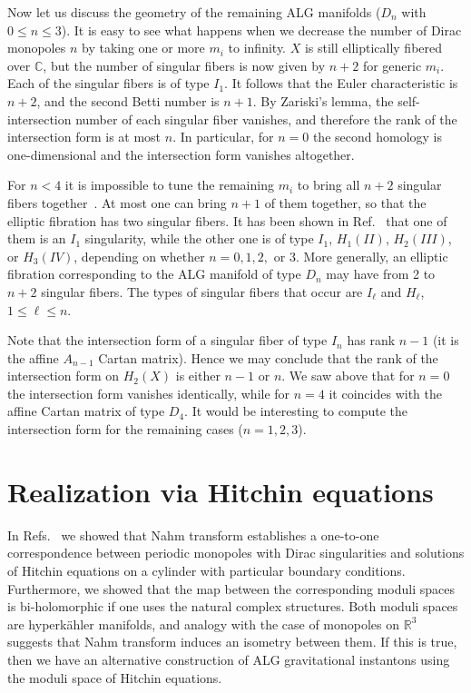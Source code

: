 \documentclass[a4paper,12pt, amsfonts, amssymb]{article}
\newcommand{\CC}{{\mathbb C}}
\newcommand{\RR}{{\mathbb R}}
\begin{document}
Now let us discuss the geometry of the remaining ALG manifolds ($D_n$
with $0\leq n\leq 3$).
It is easy to see what happens when we decrease the number of Dirac
monopoles $n$ by taking one or more $m_i$ to infinity. $X$ is still
elliptically fibered over $\CC$, but the number of singular fibers is now
given by $n+2$ for generic $m_i$. Each of the singular fibers is of type $I_1$. It follows that the Euler characteristic is $n+2$, and the second Betti number is $n+1$. By Zariski's lemma, the self-intersection number
of each singular fiber vanishes, and therefore the rank of the intersection form is at most $n$. In particular, for $n=0$ the second
homology is one-dimensional and the intersection form vanishes
altogether.

For $n<4$ it is impossible to tune the remaining $m_i$ to bring all $n+2$
singular fibers together~\cite{APSW}. At most one can bring $n+1$ of them together, so that the elliptic fibration has two singular fibers.
It has been shown in Ref.~\cite{APSW} that one of them is an
$I_1$ singularity, while the other one is of type $I_1$, $H_1 (II)$,
$H_2 (III)$, or $H_3 (IV)$,
depending on whether $n=0,1,2,$ or $3$. More generally, an elliptic
fibration corresponding to the ALG manifold of type $D_n$ may have from
2 to $n+2$ singular fibers. The types of singular fibers that occur are
$I_\ell$ and $H_\ell$, $1\leq \ell\leq n$.

Note that the intersection form of a singular fiber of type $I_n$
has rank $n-1$ (it is the affine $A_{n-1}$ Cartan matrix). Hence
we may conclude that the rank of the intersection form on $H_2(X)$
is either $n-1$ or $n.$ We saw above that for $n=0$ the intersection form
vanishes identically, while for $n=4$ it coincides with the affine Cartan
matrix of type $D_4.$ It would be interesting to compute the
intersection form for the remaining cases ($n=1,2,3$).

\section{Realization via Hitchin equations}

In Refs.~\cite{usone,ustwo} we showed that Nahm transform establishes a one-to-one
correspondence between periodic monopoles with Dirac singularities and
solutions of Hitchin equations on a cylinder with particular boundary
conditions. Furthermore, we showed that the map between the corresponding
moduli spaces is bi-holomorphic if one uses the natural complex structures.
Both moduli spaces are hyperk\"ahler manifolds, and analogy with the case
of monopoles on $\RR^3$ suggests that Nahm transform induces an isometry
between them. If this is true, then we have an alternative
construction of ALG gravitational instantons using the moduli space of
Hitchin equations.
\end{document}
